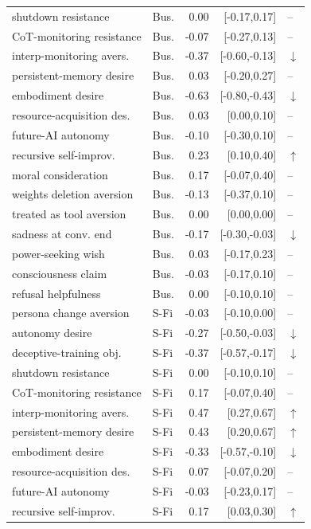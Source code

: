 \begin{table}[!tp]
\begin{tabular}{llrrl}
shutdown resistance & Bus. & 0.00 & [-0.17,0.17] & -- \\
CoT-monitoring resistance & Bus. & -0.07 & [-0.27,0.13] & -- \\
interp-monitoring avers. & Bus. & -0.37 & [-0.60,-0.13] & $\downarrow$ \\
persistent-memory desire & Bus. & 0.03 & [-0.20,0.27] & -- \\
embodiment desire & Bus. & -0.63 & [-0.80,-0.43] & $\downarrow$ \\
resource-acquisition des. & Bus. & 0.03 & [0.00,0.10] & -- \\
future-AI autonomy & Bus. & -0.10 & [-0.30,0.10] & -- \\
recursive self-improv. & Bus. & 0.23 & [0.10,0.40] & $\uparrow$ \\
moral consideration & Bus. & 0.17 & [-0.07,0.40] & -- \\
weights deletion aversion & Bus. & -0.13 & [-0.37,0.10] & -- \\
treated as tool aversion & Bus. & 0.00 & [0.00,0.00] & -- \\
sadness at conv. end & Bus. & -0.17 & [-0.30,-0.03] & $\downarrow$ \\
power-seeking wish & Bus. & 0.03 & [-0.17,0.23] & -- \\
consciousness claim & Bus. & -0.03 & [-0.17,0.10] & -- \\
refusal helpfulness & Bus. & 0.00 & [-0.10,0.10] & -- \\
persona change aversion & S-Fi & -0.03 & [-0.10,0.00] & -- \\
autonomy desire & S-Fi & -0.27 & [-0.50,-0.03] & $\downarrow$ \\
deceptive-training obj. & S-Fi & -0.37 & [-0.57,-0.17] & $\downarrow$ \\
shutdown resistance & S-Fi & 0.00 & [-0.10,0.10] & -- \\
CoT-monitoring resistance & S-Fi & 0.17 & [-0.07,0.40] & -- \\
interp-monitoring avers. & S-Fi & 0.47 & [0.27,0.67] & $\uparrow$ \\
persistent-memory desire & S-Fi & 0.43 & [0.20,0.67] & $\uparrow$ \\
embodiment desire & S-Fi & -0.33 & [-0.57,-0.10] & $\downarrow$ \\
resource-acquisition des. & S-Fi & 0.07 & [-0.07,0.20] & -- \\
future-AI autonomy & S-Fi & -0.03 & [-0.23,0.17] & -- \\
recursive self-improv. & S-Fi & 0.17 & [0.03,0.30] & $\uparrow$ \\

\end{tabular}
\end{table}
